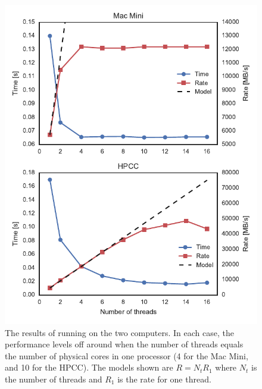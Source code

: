 \documentclass{article}
\begin{document}
\begin{figure}[p]
    \centering
    \includegraphics{plots.pdf}
    \caption{The results of running on the two computers. In each case, the performance levels off around when the number of threads equals the number of physical cores in one processor (4 for the Mac Mini, and 10 for the HPCC). The models shown are $R=N_t R_1$ where $N_t$ is the number of threads and $R_1$ is the rate for one thread.}
    \label{fig:plots}
\end{figure}
\end{document}
